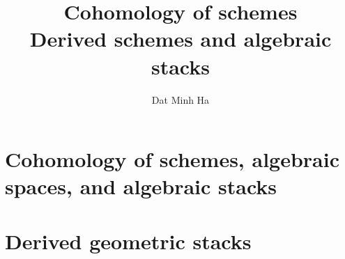 

\setcounter{section}{-1}





	\title{Cohomology of schemes\\Derived schemes and algebraic stacks}
	
	\author{Dat Minh Ha}
	\maketitle
	
	\begin{abstract}
	    
	\end{abstract}
	
	{
      \hypersetup{} 
      \dominitoc
      \tableofcontents %
    }
    
    
    
    \chapter{Cohomology of schemes, algebraic spaces, and algebraic stacks}
        \begin{abstract}
            
        \end{abstract}
        
        \minitoc
    
    \chapter{Derived geometric stacks}
        \begin{abstract}
            
        \end{abstract}
        
        \minitoc
    
